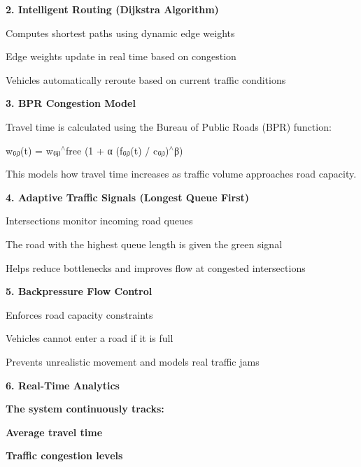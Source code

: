 {\bfseries{2. Intelligent Routing (Dijkstra Algorithm)}}


\begin{DoxyItemize}
\item Computes shortest paths using dynamic edge weights
\item Edge weights update in real time based on congestion
\item Vehicles automatically reroute based on current traffic conditions
\end{DoxyItemize}

{\bfseries{3. BPR Congestion Model}}


\begin{DoxyItemize}
\item Travel time is calculated using the Bureau of Public Roads (BPR) function:\+
\item w₍ᵢⱼ₎(t) = w₍ᵢⱼ₎\texorpdfstring{$^\wedge$}{\string^}free (1 + α (f₍ᵢⱼ₎(t) /\+ c₍ᵢⱼ₎)\texorpdfstring{$^\wedge$}{\string^}β)
\item This models how travel time increases as traffic volume approaches road capacity.
\end{DoxyItemize}

{\bfseries{4. Adaptive Traffic Signals (Longest Queue First)}}


\begin{DoxyItemize}
\item Intersections monitor incoming road queues
\item The road with the highest queue length is given the green signal
\item Helps reduce bottlenecks and improves flow at congested intersections
\end{DoxyItemize}

{\bfseries{5. Backpressure Flow Control}}


\begin{DoxyItemize}
\item Enforces road capacity constraints
\item Vehicles cannot enter a road if it is full
\item Prevents unrealistic movement and models real traffic jams
\end{DoxyItemize}

{\bfseries{6. Real-\/\+Time Analytics}}

{\bfseries{The system continuously tracks:\+}}

{\bfseries{Average travel time}}

{\bfseries{Traffic congestion levels}}

